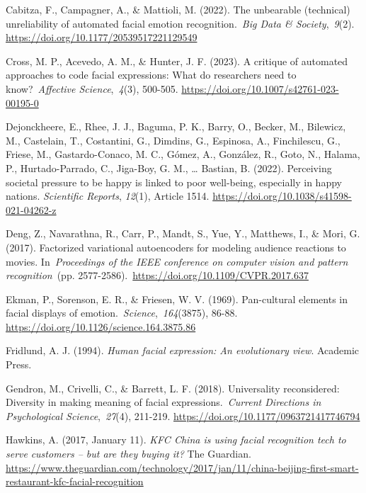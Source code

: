 \documentclass[authordate, reflection,issue]{jote-new-article}
\begin{document}
	Cabitza, F., Campagner, A., \& Mattioli, M. (2022). The unbearable (technical) unreliability of automated facial emotion recognition. \emph{Big Data \& Society}, \emph{9}(2). \url{https://doi.org/10.1177/20539517221129549}



	Cross, M. P., Acevedo, A. M., \& Hunter, J. F. (2023). A critique of automated approaches to code facial expressions: What do researchers need to know? \emph{Affective Science}, \emph{4}(3), 500-505. \url{https://doi.org/10.1007/s42761-023-00195-0}



	Dejonckheere, E., Rhee, J. J., Baguma, P. K., Barry, O., Becker, M., Bilewicz, M., Castelain, T., Costantini, G., Dimdins, G., Espinosa, A., Finchilescu, G., Friese, M., Gastardo-Conaco, M. C., Gómez, A., González, R., Goto, N., Halama, P., Hurtado-Parrado, C., Jiga-Boy, G. M., … Bastian, B. (2022). Perceiving societal pressure to be happy is linked to poor well-being, especially in happy nations. \emph{Scientific Reports}, \emph{12}(1), Article 1514. \url{https://doi.org/10.1038/s41598-021-04262-z}



	Deng, Z., Navarathna, R., Carr, P., Mandt, S., Yue, Y., Matthews, I., \& Mori, G. (2017). Factorized variational autoencoders for modeling audience reactions to movies. In \emph{Proceedings of the IEEE conference on computer vision and pattern recognition} (pp. 2577-2586). \url{https://doi.org/10.1109/CVPR.2017.637}



	Ekman, P., Sorenson, E. R., \& Friesen, W. V. (1969). Pan-cultural elements in facial displays of emotion. \emph{Science}, \emph{164}(3875), 86-88. \url{https://doi.org/10.1126/science.164.3875.86}



	Fridlund, A. J. (1994). \emph{Human facial expression: An evolutionary view}. Academic Press.



	Gendron, M., Crivelli, C., \& Barrett, L. F. (2018). Universality reconsidered: Diversity in making meaning of facial expressions. \emph{Current Directions in Psychological Science}, \emph{27}(4), 211-219. \url{https://doi.org/10.1177/0963721417746794}



	Hawkins, A. (2017, January 11). \emph{KFC China is using facial recognition tech to serve } \emph{customers -- but are they buying it?} The Guardian. \url{https://www.theguardian.com/technology/2017/jan/11/china-beijing-first-smart-restaurant-kfc-facial-recognition}
\end{document}
